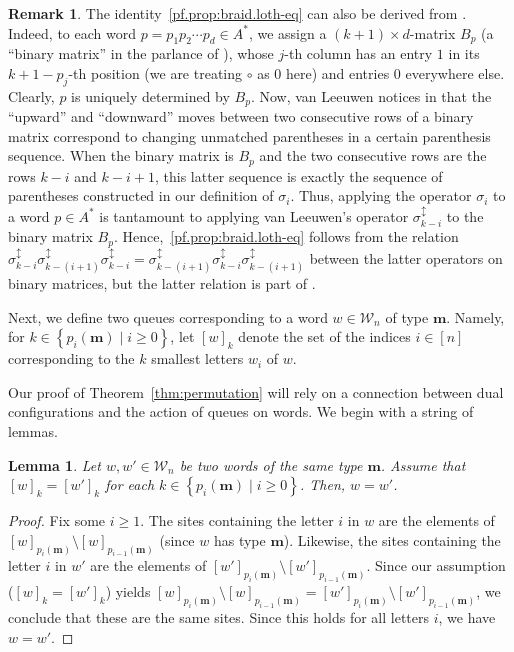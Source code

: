 \documentclass[reqno]{amsart}
\newcommand{\0}{\phantom{c}}
\newcommand{\mm}{\mathbf{m}}
\newcommand{\mcW}{\mathcal{W}}
\newcommand{\set}[1]{\left\{ #1 \right\}}
\newcommand{\tup}[1]{\left( #1 \right)}
\newcommand{\ive}[1]{\left[ #1 \right]}
\theoremstyle{plain}
\newtheorem{lemma}[thm]{Lemma}
\theoremstyle{definition}
\newtheorem{remark}[thm]{Remark}
\numberwithin{equation}{section}
\begin{document}
\begin{remark}
\label{rmk:braid.leeuwen}
The identity~\eqref{pf.prop:braid.loth-eq} can also be derived from \cite[Lemma 2.3]{vanLeeuwen-dc}. Indeed, to each word $p = p_1 p_2 \cdots p_d \in A^*$, we assign a $\tup{k+1} \times d$-matrix $B_p$ (a ``binary matrix'' in the parlance of \cite{vanLeeuwen-dc}), whose $j$-th column has an entry $1$ in its $k+1-p_j$-th position (we are treating $\circ$ as $0$ here) and entries $0$ everywhere else. Clearly, $p$ is uniquely determined by $B_p$. Now, van Leeuwen notices in \cite[before Proposition 1.3.5]{vanLeeuwen-dc} that the ``upward'' and ``downward'' moves between two consecutive rows of a binary matrix correspond to changing unmatched parentheses in a certain parenthesis sequence. When the binary matrix is $B_p$ and the two consecutive rows are the rows $k-i$ and $k-i+1$, this latter sequence is exactly the sequence of parentheses constructed in our definition of $\sigma_i$. Thus, applying the operator $\sigma_i$ to a word $p \in A^*$ is tantamount to applying van Leeuwen's operator $\sigma_{k-i}^{\updownarrow}$ to the binary matrix $B_p$. Hence,~\eqref{pf.prop:braid.loth-eq} follows from the relation $\sigma_{k-i}^{\updownarrow} \sigma_{k-(i+1)}^{\updownarrow} \sigma_{k-i}^{\updownarrow} = \sigma_{k-(i+1)}^{\updownarrow} \sigma_{k-i}^{\updownarrow} \sigma_{k-(i+1)}^{\updownarrow}$ between the latter operators on binary matrices, but the latter relation is part of \cite[Lemma 2.3]{vanLeeuwen-dc}.
\end{remark}

Next, we define two queues corresponding to a word $w \in \mcW_n$ of type $\mm$.
Namely, for $k \in \set{p_i(\mm) \mid i \geq 0}$, let $[w]_k$ denote the set of the indices $i \in \ive{n}$
corresponding to the $k$ smallest letters $w_i$ of $w$.

Our proof of Theorem~\ref{thm:permutation} will rely on a connection between dual configurations and the action of queues on words.
We begin with a string of lemmas.

\begin{lemma} \label{lem:SL.reconstruct}
Let $w, w' \in \mcW_n$ be two words of the same type $\mm$.
Assume that $[w]_k = [w']_k$ for each $k \in \set{p_i(\mm) \mid i \geq 0}$.
Then, $w = w'$.
\end{lemma}

\begin{proof}
Fix some $i \geq 1$.
The sites containing the letter $i$ in $w$ are the elements of $[w]_{p_i(\mm)} \setminus [w]_{p_{i-1}(\mm)}$
(since $w$ has type $\mm$).
Likewise,
the sites containing the letter $i$ in $w'$ are the elements of $[w']_{p_i(\mm)} \setminus [w']_{p_{i-1}(\mm)}$.
Since our assumption ($[w]_k = [w']_k$) yields $[w]_{p_i(\mm)} \setminus [w]_{p_{i-1}(\mm)}
= [w']_{p_i(\mm)} \setminus [w']_{p_{i-1}(\mm)}$,
we conclude that these are the same sites.
Since this holds for all letters $i$, we have $w = w'$.
\end{proof}
\end{document}
